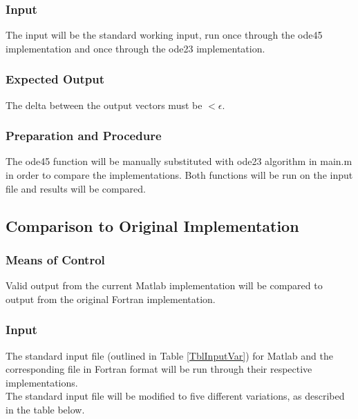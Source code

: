 \documentclass[12pt]{article}
\begin{document}
\subsubsection{Input}
The input will be the standard working input, run once through the ode45 implementation
 and once through the ode23 implementation. 

\subsubsection{Expected Output}
The delta between the output vectors must be 
$< \epsilon$.

\subsubsection{Preparation and Procedure}
The ode45 function will be manually substituted with ode23 algorithm in main.m in order to compare the implementations. Both functions will be run on the input file and results will be compared.

\subsection{Comparison to Original Implementation}
\subsubsection{Means of Control}
Valid output from the current Matlab implementation will be compared to output
 from the original Fortran implementation.
 
\subsubsection{Input}
The standard input file (outlined in Table \ref{TblInputVar}) for Matlab and the corresponding file in Fortran format will be run through their respective implementations. 
 \\ The standard input file will be modified to five different variations, as described in the table below.
 
\end{document}
